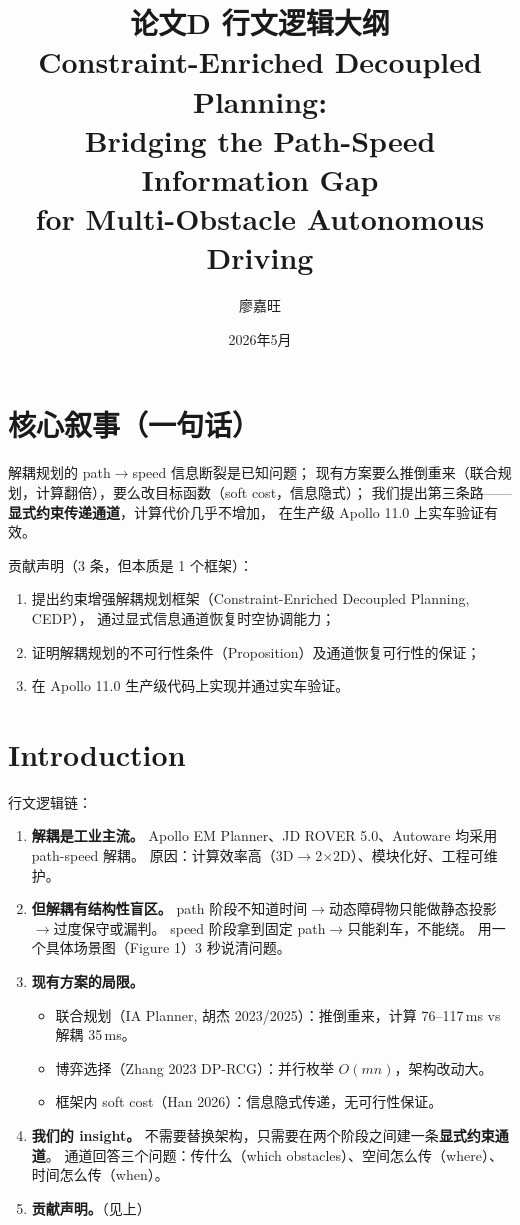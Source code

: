 \documentclass[a4paper,12pt]{article}
\title{论文D 行文逻辑大纲\\[4pt]
\large Constraint-Enriched Decoupled Planning:\\
Bridging the Path-Speed Information Gap\\for Multi-Obstacle Autonomous Driving}
\author{廖嘉旺}
\date{2026年5月}
\begin{document}
\maketitle

\section*{核心叙事（一句话）}

解耦规划的 path$\to$speed 信息断裂是已知问题；
现有方案要么推倒重来（联合规划，计算翻倍），要么改目标函数（soft cost，信息隐式）；
我们提出第三条路——\textbf{显式约束传递通道}，计算代价几乎不增加，
在生产级 Apollo 11.0 上实车验证有效。

贡献声明（3 条，但本质是 1 个框架）：
\begin{enumerate}
  \item 提出约束增强解耦规划框架（Constraint-Enriched Decoupled Planning, CEDP），
        通过显式信息通道恢复时空协调能力；
  \item 证明解耦规划的不可行性条件（Proposition）及通道恢复可行性的保证；
  \item 在 Apollo 11.0 生产级代码上实现并通过实车验证。
\end{enumerate}

\section{Introduction}

行文逻辑链：

\begin{enumerate}
  \item \textbf{解耦是工业主流。}
        Apollo EM Planner、JD ROVER 5.0、Autoware 均采用 path-speed 解耦。
        原因：计算效率高（3D$\to$2$\times$2D）、模块化好、工程可维护。
  \item \textbf{但解耦有结构性盲区。}
        path 阶段不知道时间$\to$动态障碍物只能做静态投影$\to$过度保守或漏判。
        speed 阶段拿到固定 path$\to$只能刹车，不能绕。
        用一个具体场景图（Figure 1）3 秒说清问题。
  \item \textbf{现有方案的局限。}
        \begin{itemize}
          \item 联合规划（IA Planner, 胡杰 2023/2025）：推倒重来，计算 76--117\,ms vs 解耦 35\,ms。
          \item 博弈选择（Zhang 2023 DP-RCG）：并行枚举 $O(mn)$，架构改动大。
          \item 框架内 soft cost（Han 2026）：信息隐式传递，无可行性保证。
        \end{itemize}
  \item \textbf{我们的 insight。}
        不需要替换架构，只需要在两个阶段之间建一条\textbf{显式约束通道}。
        通道回答三个问题：传什么（which obstacles）、空间怎么传（where）、时间怎么传（when）。
  \item \textbf{贡献声明。}（见上）
\end{enumerate}
\end{document}
